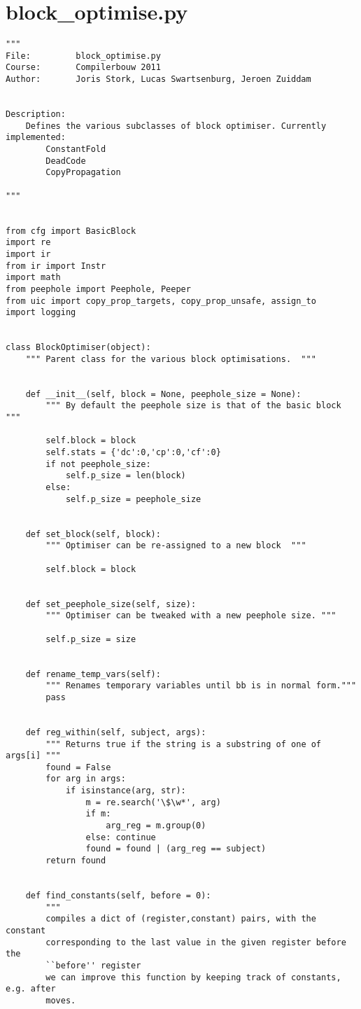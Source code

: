 \section{block\_optimise.py}
\begin{lstlisting}
""" 
File:         block_optimise.py
Course:       Compilerbouw 2011
Author:       Joris Stork, Lucas Swartsenburg, Jeroen Zuiddam


Description:
    Defines the various subclasses of block optimiser. Currently implemented:
        ConstantFold
        DeadCode
        CopyPropagation

"""


from cfg import BasicBlock
import re
import ir
from ir import Instr
import math
from peephole import Peephole, Peeper
from uic import copy_prop_targets, copy_prop_unsafe, assign_to
import logging


class BlockOptimiser(object):
    """ Parent class for the various block optimisations.  """


    def __init__(self, block = None, peephole_size = None):
        """ By default the peephole size is that of the basic block """

        self.block = block
        self.stats = {'dc':0,'cp':0,'cf':0}
        if not peephole_size:
            self.p_size = len(block)
        else:
            self.p_size = peephole_size


    def set_block(self, block):
        """ Optimiser can be re-assigned to a new block  """
        
        self.block = block


    def set_peephole_size(self, size):
        """ Optimiser can be tweaked with a new peephole size. """

        self.p_size = size


    def rename_temp_vars(self):
        """ Renames temporary variables until bb is in normal form."""
        pass

    
    def reg_within(self, subject, args):
        """ Returns true if the string is a substring of one of args[i] """
        found = False
        for arg in args:
            if isinstance(arg, str):
                m = re.search('\$\w*', arg)
                if m:
                    arg_reg = m.group(0)
                else: continue
                found = found | (arg_reg == subject)
        return found


    def find_constants(self, before = 0):
        """ 
        compiles a dict of (register,constant) pairs, with the constant
        corresponding to the last value in the given register before the
        ``before'' register 
        we can improve this function by keeping track of constants, e.g. after
        moves.
        

\end{lstlisting}
